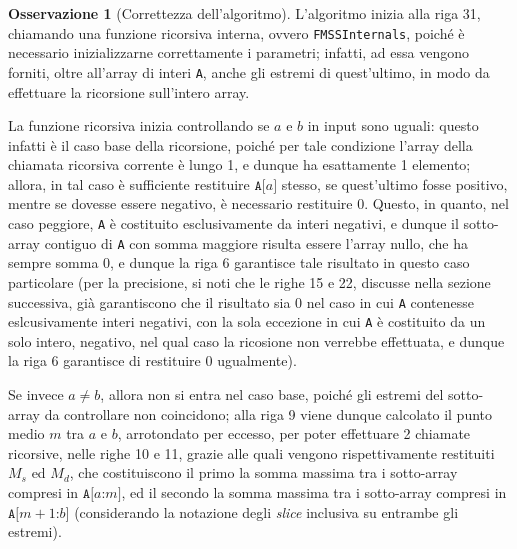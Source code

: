 \documentclass[14pt]{extreport}
\theoremstyle{definition}
\theoremstyle{definition}
\newtheorem{remark}{Osservazione}[subsection]
\begin{document}
\begin{remark}[Correttezza dell'algoritmo]
    L'algoritmo inizia alla riga 31, chiamando una funzione ricorsiva interna, ovvero \texttt{FMSSInternals}, poiché è necessario inizializzarne correttamente i parametri; infatti, ad essa vengono forniti, oltre all'array di interi \texttt{A}, anche gli estremi di quest'ultimo, in modo da effettuare la ricorsione sull'intero array.

    La funzione ricorsiva inizia controllando se $a$ e $b$ in input sono uguali: questo infatti è il caso base della ricorsione, poiché per tale condizione l'array della chiamata ricorsiva corrente è lungo 1, e dunque ha esattamente 1 elemento; allora, in tal caso è sufficiente restituire $\texttt{A[}a\texttt{]}$ stesso, se quest'ultimo fosse positivo, mentre se dovesse essere negativo, è necessario restituire 0. Questo, in quanto, nel caso peggiore, \texttt{A} è costituito esclusivamente da interi negativi, e dunque il sotto-array contiguo di \texttt{A} con somma maggiore risulta essere l'array nullo, che ha sempre somma 0, e dunque la riga 6 garantisce tale risultato in questo caso particolare (per la precisione, si noti che le righe 15 e 22, discusse nella sezione successiva, già garantiscono che il risultato sia 0 nel caso in cui \texttt{A} contenesse eslcusivamente interi negativi, con la sola eccezione in cui \texttt{A} è costituito da un solo intero, negativo, nel qual caso la ricosione non verrebbe effettuata, e dunque la riga 6 garantisce di restituire 0 ugualmente).

    Se invece $a \neq b$, allora non si entra nel caso base, poiché gli estremi del sotto-array da controllare non coincidono; alla riga 9 viene dunque calcolato il punto medio $m$ tra $a$ e $b$, arrotondato per eccesso, per poter effettuare 2 chiamate ricorsive, nelle righe 10 e 11, grazie alle quali vengono rispettivamente restituiti $M_s$ ed $M_d$, che costituiscono il primo la somma massima tra i sotto-array compresi in $\texttt{A[}a\texttt{:}m\texttt{]}$, ed il secondo la somma massima tra i sotto-array compresi in $\texttt{A[}m + 1\texttt{:}b\texttt{]}$ (considerando la notazione degli \textit{slice} inclusiva su entrambe gli estremi).


\end{remark}
\end{document}
